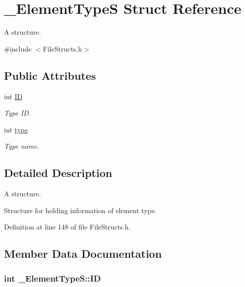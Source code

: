 \hypertarget{struct___element_type_s}{}\section{\+\_\+\+Element\+TypeS Struct Reference}
\label{struct___element_type_s}


A structure.  




{\ttfamily \#include $<$File\+Structs.\+h$>$}

\subsection*{Public Attributes}
\begin{DoxyCompactItemize}
\item 
int \hyperlink{struct___element_type_s_a697ec0d9f2ed3b89d9a989b0529bcc63}{ID}
\begin{DoxyCompactList}\small\item\em Type ID. \end{DoxyCompactList}\item 
int \hyperlink{struct___element_type_s_a9da836c0ca286be959134763e79c9d71}{type}
\begin{DoxyCompactList}\small\item\em Type name. \end{DoxyCompactList}\end{DoxyCompactItemize}


\subsection{Detailed Description}
A structure. 

Structure for holding information of element type. 

Definition at line 148 of file File\+Structs.\+h.



\subsection{Member Data Documentation}
\subsubsection[{\texorpdfstring{ID}{ID}}]{\setlength{\rightskip}{0pt plus 5cm}int \+\_\+\+Element\+Type\+S\+::\+ID}\hypertarget{struct___element_type_s_a697ec0d9f2ed3b89d9a989b0529bcc63}{}\label{struct___element_type_s_a697ec0d9f2ed3b89d9a989b0529bcc63}


